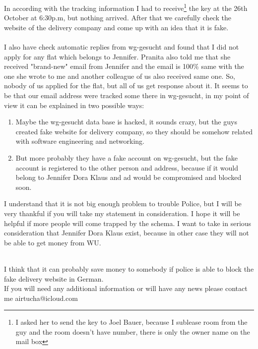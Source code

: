 \documentclass[english]{article}
\begin{document}
In according with the tracking information I had to receive\footnote{I asked her to send the key to Joel Bauer, because I sublease room from the guy and the room doesn't have number, there is only the owner name on the mail box} the key at the 26th October at 6:30p.m, but nothing arrived. After that we carefully check the website of the delivery company and come up with an idea that it is fake.\\\\

I also have check automatic replies from wg-gesucht and found that I did not apply for any flat which belongs to Jennifer. Pranita also told me that she received "brand-new" email from Jennifer and the email is 100\% same with the one she wrote to me and another colleague of us also received same one. So, nobody of us applied for the flat, but all of us get response about it. It seems to be that our email address were tracked some there in wg-gesucht, in my point of view it can be explained in two possible ways:\\

\begin{enumerate}
\item Maybe the wg-gesucht data base is hacked, it sounds crazy, but the guys created fake website for delivery company, so they should be somehow related with software engineering and networking.
\item But more probably they have a fake account on wg-gesucht, but the fake account is registered to the other person and address, because if it would belong to Jennifer Dora Klaus and ad would be compromised and blocked soon.
\end{enumerate}

I understand that it is not big enough problem to trouble Police, but I will be very thankful if you will take my statement in consideration. I hope it will be helpful if more people will come trapped by the schema. I want to take in serious consideration that Jennifer Dora Klaus exist, because in other case they will not be able to get money from WU.\\\

I think that it can probably save money to somebody if police is able to block the fake delivery website in German.\\

If you will need any additional information or will have any news please contact me airtucha@icloud.com
\end{document}
